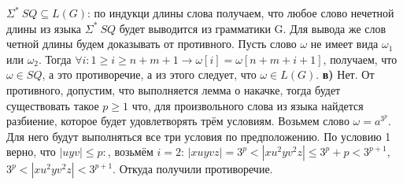 \documentclass[a4paper,14pt]{article} %
\begin{document}
\newline
$\Sigma^* \ SQ \subseteq L(G)$: по индукци длины слова получаем, что любое слово нечетной длины из языка $\Sigma^* \ SQ$ будет выводится из грамматики G.
Для вывода же слов четной длины будем доказывать от противного. Пусть слово $\omega$ не имеет вида $\omega_1$ или $\omega_2$. Тогда $\forall i : 1 \geqslant i \geqslant n + m + 1 \longrightarrow \omega[i] = \omega[n+m+i+1]$, получаем, что $\omega \in SQ$, а это противоречие, а из этого следует, что $\omega \in L(G)$. 
\newline
\textbf{в)} Нет. От противного, допустим, что выполняется лемма о накачке, тогда будет существовать такое $p \geqslant 1$ что, для произвольного слова из языка найдется разбиение, которое будет удовлетворять трём условиям. Возьмем слово $\omega = a^{3^p}$. Для него будут выполняться все три условия по предположению. По условию 1 верно, что $|uyv| \leqslant p:$, возьмём $i = 2$:
$|xuyvz| = 3^p < |xu^2yv^2z| \leqslant 3^p + p < 3^{p+1}$, $3^p < |xu^2yv^2z| < 3^{p+1}$. Откуда получили противоречие.
\end{document}
